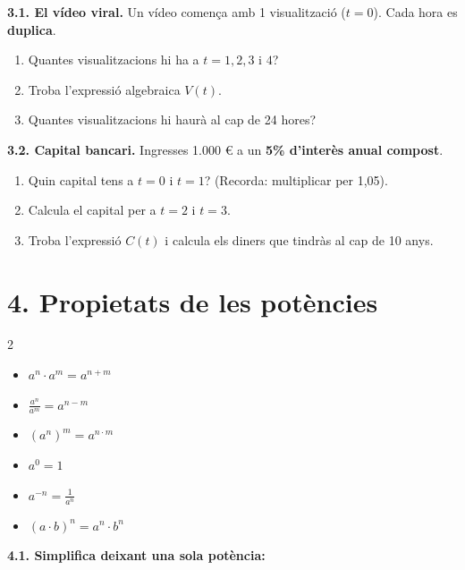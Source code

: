 \documentclass[12pt,a4paper]{article}
\begin{document}
\textbf{3.1. El vídeo viral.} Un vídeo comença amb 1 visualització ($t=0$). Cada hora es \textbf{duplica}.
\begin{enumerate}[label=\alph*)]
    \item Quantes visualitzacions hi ha a $t=1, 2, 3$ i $4$?
    \item Troba l'expressió algebraica $V(t)$.
    \item Quantes visualitzacions hi haurà al cap de 24 hores?
\end{enumerate}

\textbf{3.2. Capital bancari.} Ingresses 1.000 \euro{} a un \textbf{5\% d'interès anual compost}.
\begin{enumerate}[label=\alph*)]
    \item Quin capital tens a $t=0$ i $t=1$? (Recorda: multiplicar per 1,05).
    \item Calcula el capital per a $t=2$ i $t=3$.
    \item Troba l'expressió $C(t)$ i calcula els diners que tindràs al cap de 10 anys.
\end{enumerate}

\newpage

\section*{4. Propietats de les potències}

\begin{tcolorbox}[colback=verdfosc!5, colframe=verdfosc, title=\textbf{Recordatori de propietats}]
    \begin{multicols}{2}
    \begin{itemize}
        \item $a^n \cdot a^m = a^{n+m}$
        \item $\frac{a^n}{a^m} = a^{n-m}$
        \item $(a^n)^m = a^{n \cdot m}$
        \item $a^0 = 1$
        \item $a^{-n} = \frac{1}{a^n}$
        \item $(a \cdot b)^n = a^n \cdot b^n$
    \end{itemize}
    \end{multicols}
\end{tcolorbox}

\textbf{4.1. Simplifica deixant una sola potència:}
\end{document}
